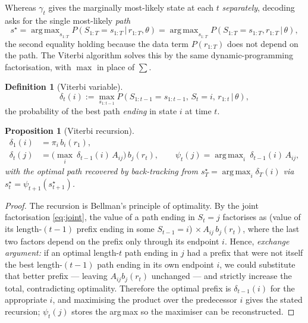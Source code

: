 \documentclass[11pt]{article}
\newcommand{\given}{\,\vert\,}
\newcommand{\eqdef}{:=}
\DeclareMathOperator*{\argmax}{arg\,max}
\newcommand{\state}{S}
\newcommand{\obs}{r}
\theoremstyle{plain}
\newtheorem{proposition}{Proposition}
\theoremstyle{definition}
\newtheorem{definition}{Definition}
\theoremstyle{remark}
\begin{document}
Whereas $\gamma_t$ gives the marginally most-likely state at each $t$
\emph{separately}, decoding asks for the single most-likely \emph{path}
\begin{equation}
  s^\star = \argmax_{s_{1:T}} P(\state_{1:T}=s_{1:T}\given\obs_{1:T},\theta)
          = \argmax_{s_{1:T}} P(\state_{1:T}=s_{1:T},\obs_{1:T}\given\theta),
\end{equation}
the second equality holding because the data term $P(\obs_{1:T})$ does not depend
on the path. The Viterbi algorithm solves this by the same dynamic-programming
factorisation, with $\max$ in place of $\sum$.

\begin{definition}[Viterbi variable]
\begin{equation}
  \delta_t(i) \eqdef \max_{s_{1:t-1}}
  P(\state_{1:t-1}=s_{1:t-1},\,\state_t=i,\,\obs_{1:t}\given\theta),
\end{equation}
the probability of the best path \emph{ending} in state $i$ at time $t$.
\end{definition}

\begin{proposition}[Viterbi recursion]
\begin{align}
  \delta_1(i) &= \pi_i\, b_i(\obs_1),\\
  \delta_t(j) &= \Big(\max_{i}\ \delta_{t-1}(i)\,A_{ij}\Big)\, b_j(\obs_t),
  \qquad
  \psi_t(j) = \argmax_{i}\ \delta_{t-1}(i)\,A_{ij},
\end{align}
with the optimal path recovered by back-tracking from
$s^\star_T=\argmax_i\delta_T(i)$ via $s^\star_t=\psi_{t+1}(s^\star_{t+1})$.
\end{proposition}

\begin{proof}
The recursion is Bellman's principle of optimality. By the joint factorisation
\eqref{eq:joint}, the value of a path ending in $\state_t=j$ factorises as
(value of its length-$(t-1)$ prefix ending in some $\state_{t-1}=i$)
$\times\,A_{ij}\,b_j(\obs_t)$, where the last two factors depend on the prefix
only through its endpoint $i$. Hence, \emph{exchange argument:} if an optimal
length-$t$ path ending in $j$ had a prefix that were not itself the best
length-$(t-1)$ path ending in its own endpoint $i$, we could substitute that
better prefix --- leaving $A_{ij}b_j(\obs_t)$ unchanged --- and strictly increase
the total, contradicting optimality. Therefore the optimal prefix is
$\delta_{t-1}(i)$ for the appropriate $i$, and maximising the product over the
predecessor $i$ gives the stated recursion; $\psi_t(j)$ stores the arg\,max so
the maximiser can be reconstructed.
\end{proof}
\end{document}
